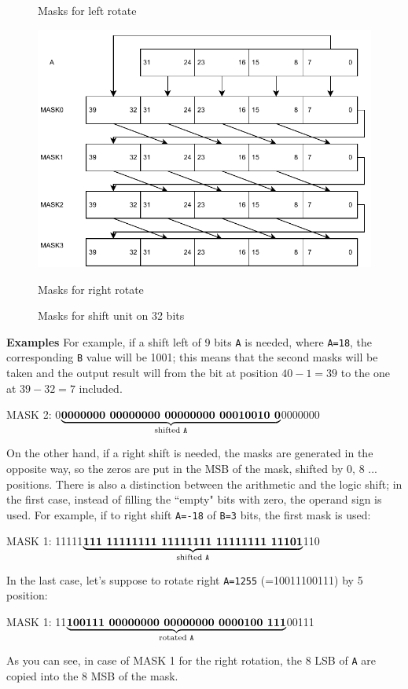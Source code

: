 \begin{figure}[h]
\begin{minipage}[b]{0.5\linewidth}
        \caption{Masks for left rotate} 
        \vspace{4ex}
    \end{minipage}%
    \begin{minipage}[b]{0.5\linewidth}
        \centering
        \includegraphics[width=.78\linewidth]{chapters/5_ExecuteStage/images/right_rotate.pdf} 
        \caption{Masks for right rotate} 
        \vspace{4ex}
    \end{minipage} 
    \caption{Masks for shift unit on 32 bits} 
\end{figure}
\begin{mybox}
    \textbf{Examples}
    \newline
    For example, if a shift left of 9 bits \texttt{A} is needed, where \texttt{A=18}, the corresponding \texttt{B} value will be 1001; this means that the second masks will be taken and the output result will from the bit at position $40-1=39$ to the one at $39-32=7$ included.
    \begin{center}
        MASK 2: 0$\underbrace{\textbf{0000000 00000000 00000000 00010010 0}}_{\text{shifted \texttt{A}}}$0000000
    \end{center}
    
    On the other hand, if a right shift is needed, the masks are generated in the opposite way, so the zeros are put in the MSB of the mask, shifted by 0, 8 ... positions. There is also a distinction between the arithmetic and the logic shift; in the first case, instead of filling the ``empty" bits with zero, the operand sign is used. For example, if to right shift \texttt{A=-18} of \texttt{B=3} bits, the first mask is used: 
    \begin{center}
        MASK 1: 11111$\underbrace{\textbf{111 11111111 11111111 11111111 11101}}_{\text{shifted \texttt{A}}}$110
    \end{center}
    
    In the last case, let's suppose to rotate right \texttt{A=1255} (=10011100111) by 5 position:
    \begin{center}
        MASK 1: 11$\underbrace{\textbf{100111 00000000 00000000 0000100 111}}_{\text{rotated \texttt{A}}}$00111
    \end{center}
    As you can see, in case of MASK 1 for the right rotation, the 8 LSB of \texttt{A} are copied into the 8 MSB of the mask.
\end{mybox}
    

